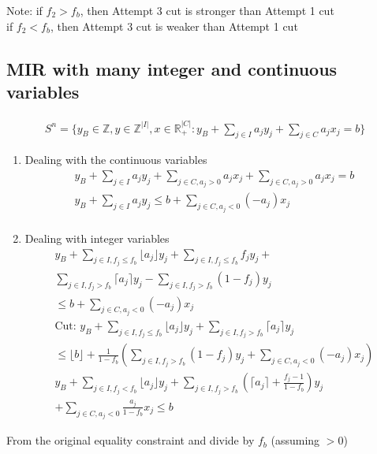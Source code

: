 \documentclass{article}
\theoremstyle{plain}
\theoremstyle{definition}
\newcommand{\floor}[1]{\lfloor #1 \rfloor}
\newcommand{\ceiling}[1]{\lceil #1 \rceil}
\begin{document}
Note: if $f_2 > f_b$, then Attempt 3 cut is stronger than Attempt 1 cut\\
if $f_2 < f_b$, then Attempt 3 cut is weaker than Attempt 1 cut

\subsection{MIR with many integer and continuous variables}
\begin{align*}
    S^n = \{y_B\in\mathbb{Z}, y\in\mathbb{Z}^{|I|}, x\in\mathbb{R}_+^{|C|}:
    y_B + \sum_{j\in I} a_jy_j + \sum_{j\in C}a_jx_j = b\}
\end{align*}

\begin{enumerate}
    \item Dealing with the continuous variables
       \begin{align*}
           y_B + \sum_{j\in I}a_jy_j + \sum_{j\in C, a_j > 0} a_jx_j + \sum_{j\in C, a_j > 0} a_jx_j = b\\
           y_B + \sum_{j\in I}a_jy_j \leq b + \sum_{j\in C, a_j < 0}(-a_j)x_j\\
       \end{align*}
   \item Dealing with integer variables
       \begin{gather*}
           y_B + \sum_{j\in I, f_j\leq f_b}\floor{a_j}y_j +
           \sum_{j\in I, f_j\leq f_b}f_jy_j +\\
           \sum_{j\in I, f_j > f_b}\ceiling{a_j}y_j -
           \sum_{j\in I, f_j > f_b}(1-f_j)y_j\\
           \leq b + \sum_{j\in C, a_j < 0} (-a_j)x_j\\
           \text{Cut: }
        y_B + \sum_{j\in I, f_j\leq f_b} \floor{a_j}y_j +
        \sum_{j\in I, f_j > f_b}\ceiling{a_j}y_j\\
        \leq \floor{b} + \frac{1}{1-f_b}(\sum_{j\in I, f_j > f_b}(1-f_j)y_j + \sum_{j\in C, a_j < 0}(-a_j)x_j)\\
        y_B + \sum_{j\in I, f_j < f_b}\floor{a_j}y_j +
           \sum_{j\in I, f_j > f_b}(\ceiling{a_j} + \frac{f_j - 1}{1-f_b})y_j\\
        + \sum_{j\in C, a_j < 0}\frac{a_j}{1-f_b}x_j \leq b
    \end{gather*}
\end{enumerate}

From the original equality constraint and divide by $f_b$ (assuming $> 0$)
\end{document}
